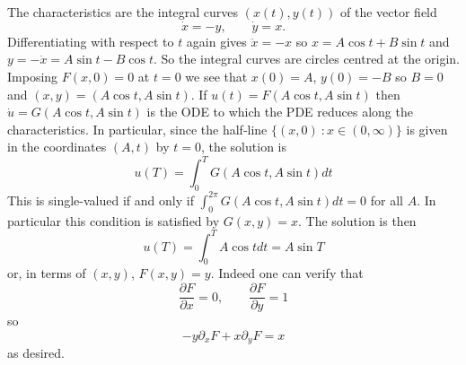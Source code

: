 \documentclass[12pt]{article}
\begin{document}
\begin{answer}
The characteristics are the integral curves $(x(t),y(t))$ of the vector field
\[\dot{x}=-y,\qquad\dot{y}=x.\]
Differentiating with respect to $t$ again gives $\ddot{x}=-x$ so $x=A\cos t+B\sin t$ and $y=-\dot{x}=A\sin t-B\cos t$. So the integral curves are circles centred at the origin. Imposing $F(x,0)=0$ at $t=0$ we see that $x(0)=A$, $y(0)=-B$ so $B=0$ and $(x,y)=(A\cos t,A\sin t)$. If $u(t)=F(A\cos t,A\sin t)$ then $\dot{u}=G(A\cos t,A\sin t)$ is the ODE to which the PDE reduces along the characteristics. In particular, since the half-line $\{(x,0)\ : x\in(0,\infty)\}$ is given in the coordinates $(A,t)$ by $t=0$, the solution is
\[u(T)=\int_0^TG(A\cos t,A\sin t)dt\]
This is single-valued if and only if $\int_0^{2\pi}G(A\cos t,A\sin t)dt=0$ for all $A$. In particular this condition is satisfied by $G(x,y)=x$. The solution is then
\[u(T)=\int_0^TA\cos tdt=A\sin T\]
or, in terms of $(x,y)$, $F(x,y)=y$. Indeed one can verify that
\[\frac{\partial F}{\partial x}=0,\qquad\frac{\partial F}{\partial y}=1\]
so
\[-y\partial_xF+x\partial_yF=x\]
as desired.
\end{answer}
\end{document}
